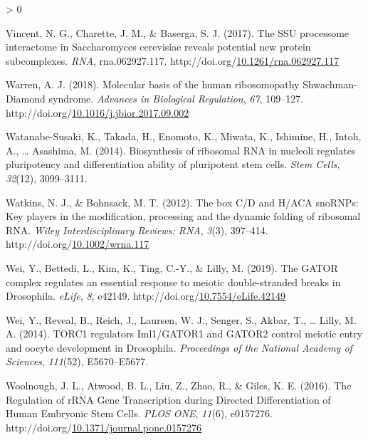 \documentclass[12pt,oneside]{reedthesis}
\newlength{\cslhangindent}
\newenvironment{CSLReferences}[2] %
 {%
  \setlength{\parindent}{0pt}
  \ifodd #1 \everypar{\setlength{\hangindent}{\cslhangindent}}\ignorespaces\fi
  \ifnum #2 > 0
  \setlength{\parskip}{#2\baselineskip}
  \fi
 }%
 {}
\begin{document}
\begin{CSLReferences}{1}{0}
\leavevmode\hypertarget{ref-vincentSSUProcessomeInteractome2017}{}%
Vincent, N. G., Charette, J. M., \& Baserga, S. J. (2017). The {SSU} processome interactome in {Saccharomyces} cerevisiae reveals potential new protein subcomplexes. \emph{RNA}, rna.062927.117. http://doi.org/\href{https://doi.org/10.1261/rna.062927.117}{10.1261/rna.062927.117}

\leavevmode\hypertarget{ref-warrenMolecularBasisHuman2018}{}%
Warren, A. J. (2018). Molecular basis of the human ribosomopathy {Shwachman-Diamond} syndrome. \emph{Advances in Biological Regulation}, \emph{67}, 109--127. http://doi.org/\href{https://doi.org/10.1016/j.jbior.2017.09.002}{10.1016/j.jbior.2017.09.002}

\leavevmode\hypertarget{ref-WatanabeSusaki2014a}{}%
Watanabe-Susaki, K., Takada, H., Enomoto, K., Miwata, K., Ishimine, H., Intoh, A., \ldots{} Asashima, M. (2014). Biosynthesis of ribosomal {RNA} in nucleoli regulates pluripotency and differentiation ability of pluripotent stem cells. \emph{Stem Cells}, \emph{32}(12), 3099--3111.

\leavevmode\hypertarget{ref-Watkins2012b}{}%
Watkins, N. J., \& Bohnsack, M. T. (2012). The box {C}/{D} and {H}/{ACA snoRNPs}: {Key} players in the modification, processing and the dynamic folding of ribosomal {RNA}. \emph{Wiley Interdisciplinary Reviews: RNA}, \emph{3}(3), 397--414. http://doi.org/\href{https://doi.org/10.1002/wrna.117}{10.1002/wrna.117}

\leavevmode\hypertarget{ref-Wei2018a}{}%
Wei, Y., Bettedi, L., Kim, K., Ting, C.-Y., \& Lilly, M. (2019). The {GATOR} complex regulates an essential response to meiotic double-stranded breaks in {Drosophila}. \emph{eLife}, \emph{8}, e42149. http://doi.org/\href{https://doi.org/10.7554/eLife.42149}{10.7554/eLife.42149}

\leavevmode\hypertarget{ref-Wei2014b}{}%
Wei, Y., Reveal, B., Reich, J., Laursen, W. J., Senger, S., Akbar, T., \ldots{} Lilly, M. A. (2014). {TORC1} regulators {Iml1}/{GATOR1} and {GATOR2} control meiotic entry and oocyte development in {Drosophila}. \emph{Proceedings of the National Academy of Sciences}, \emph{111}(52), E5670--E5677.

\leavevmode\hypertarget{ref-woolnoughRegulationRRNAGene2016}{}%
Woolnough, J. L., Atwood, B. L., Liu, Z., Zhao, R., \& Giles, K. E. (2016). The {Regulation} of {rRNA Gene Transcription} during {Directed Differentiation} of {Human Embryonic Stem Cells}. \emph{PLOS ONE}, \emph{11}(6), e0157276. http://doi.org/\href{https://doi.org/10.1371/journal.pone.0157276}{10.1371/journal.pone.0157276}


\end{CSLReferences}
\end{document}
